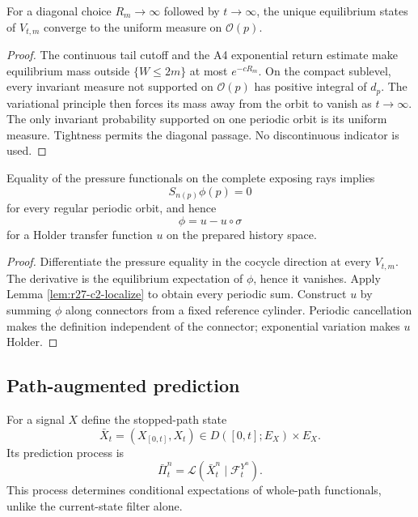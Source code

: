 \begin{lemma}
\label{lem:r27-c2-localize}
For a diagonal choice $R_m\to\infty$ followed by $t\to\infty$, the unique
equilibrium states of $V_{t,m}$ converge to the uniform measure on
$\mathcal O(p)$.
\end{lemma}

\begin{proof}
The continuous tail cutoff and the A4 exponential return estimate make
equilibrium mass outside $\{W\le2m\}$ at most $e^{-cR_m}$.  On the compact
sublevel, every invariant measure not supported on $\mathcal O(p)$ has
positive integral of $d_p$.  The variational principle then forces its mass
away from the orbit to vanish as $t\to\infty$.  The only invariant probability
supported on one periodic orbit is its uniform measure.  Tightness permits
the diagonal passage.  No discontinuous indicator is used.
\end{proof}

\begin{theorem}
\label{thm:r27-c2-rigidity}
Equality of the pressure functionals on the complete exposing rays implies
\[
 S_{n(p)}\phi(p)=0
\]
for every regular periodic orbit, and hence
\[
 \phi=u-u\circ\sigma
\]
for a Holder transfer function $u$ on the prepared history space.
\end{theorem}

\begin{proof}
Differentiate the pressure equality in the cocycle direction at every
$V_{t,m}$.  The derivative is the equilibrium expectation of $\phi$, hence it
vanishes.  Apply Lemma \ref{lem:r27-c2-localize} to obtain every periodic
sum.  Construct $u$ by summing $\phi$ along connectors from a fixed reference
cylinder.  Periodic cancellation makes the definition independent of the
connector; exponential variation makes $u$ Holder.
\end{proof}

\subsection{Path-augmented prediction}

For a signal $X$ define the stopped-path state
\[
 \bar X_t=(X_{[0,t]},X_t)\in D([0,t];E_X)\times E_X.
\]
Its prediction process is
\[
 \bar\Pi_t^n=\mathcal L(\bar X_t^n\mid\mathcal F_t^{Y^n}).               \tag{C2.7}
\]
This process determines conditional expectations of whole-path functionals,
unlike the current-state filter alone.

